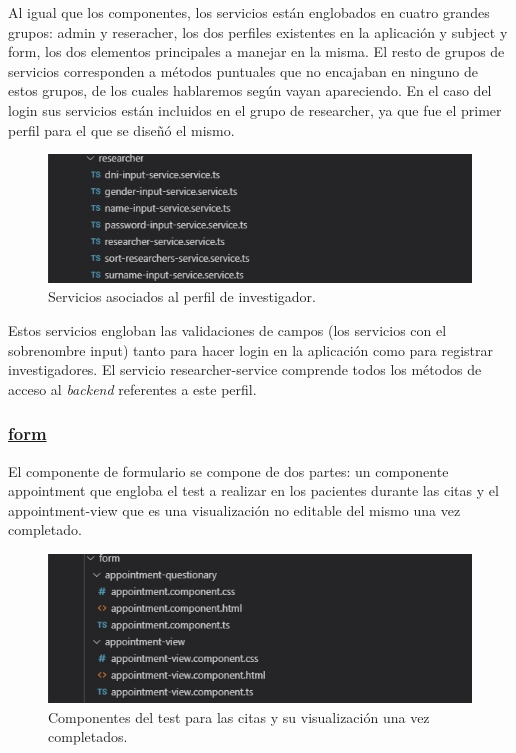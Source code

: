     Al igual que los componentes, los servicios están englobados en cuatro grandes grupos: admin y reseracher, los dos perfiles existentes en la aplicación y subject y form, los dos elementos principales a manejar en la misma. El resto de grupos de servicios corresponden a métodos puntuales que no encajaban en ninguno de estos grupos, de los cuales hablaremos según vayan apareciendo. En el caso del login sus servicios están incluidos en el grupo de researcher, ya que fue el primer perfil para el que se diseñó el mismo.
    
     \begin{figure}[h]
    \centering
     \includegraphics[width=1\textwidth]{images/researcherService.jpg}
    \caption{Servicios asociados al perfil de investigador.}
    \end{figure}
    \FloatBarrier
    
    Estos servicios engloban las validaciones de campos (los servicios con el sobrenombre input) tanto para hacer login en la aplicación como para registrar investigadores. El servicio researcher-service comprende todos los métodos de acceso al \textit{backend} referentes a este perfil.\newpage
    
    \subsubsection{\underline{form}}
    
    El componente de formulario se compone de dos partes: un componente appointment que engloba el test a realizar en los pacientes durante las citas y el appointment-view que es una visualización no editable del mismo una vez completado.
    
    \begin{figure}[h]
    \centering
    \includegraphics[width=1\textwidth]{images/formComponent.jpg}
    \caption{Componentes del test para las citas y su visualización una vez completados.}
    \end{figure}
    \FloatBarrier
    
